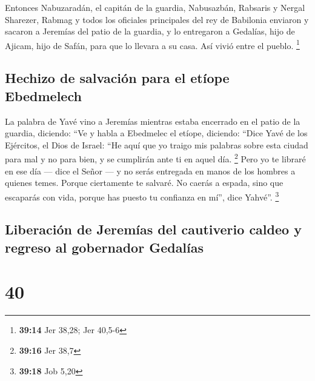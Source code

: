  Entonces Nabuzaradán, el capitán de la guardia,
Nabusazbán, Rabsaris y Nergal Sharezer, Rabmag y todos los oficiales
principales del rey de Babilonia  enviaron y sacaron a
Jeremías del patio de la guardia, y lo entregaron a Gedalías, hijo de
Ajicam, hijo de Safán, para que lo llevara a su casa. Así vivió entre el
pueblo. \footnote{\textbf{39:14} Jer 38,28; Jer 40,5-6}

\hypertarget{hechizo-de-salvaciuxf3n-para-el-etuxedope-ebedmelech}{%
\subsection{Hechizo de salvación para el etíope
Ebedmelech}\label{hechizo-de-salvaciuxf3n-para-el-etuxedope-ebedmelech}}

 La palabra de Yavé vino a Jeremías mientras estaba
encerrado en el patio de la guardia, diciendo:  ``Ve y
habla a Ebedmelec el etíope, diciendo: ``Dice Yavé de los Ejércitos, el
Dios de Israel: ``He aquí que yo traigo mis palabras sobre esta ciudad
para mal y no para bien, y se cumplirán ante ti en aquel día.
\footnote{\textbf{39:16} Jer 38,7}  Pero yo te libraré en
ese día --- dice el Señor --- y no serás entregada en manos de los
hombres a quienes temes.  Porque ciertamente te salvaré.
No caerás a espada, sino que escaparás con vida, porque has puesto tu
confianza en mí'', dice Yahvé''. \footnote{\textbf{39:18} Job 5,20}

\hypertarget{liberaciuxf3n-de-jeremuxedas-del-cautiverio-caldeo-y-regreso-al-gobernador-gedaluxedas}{%
\subsection{Liberación de Jeremías del cautiverio caldeo y regreso al
gobernador
Gedalías}\label{liberaciuxf3n-de-jeremuxedas-del-cautiverio-caldeo-y-regreso-al-gobernador-gedaluxedas}}

\hypertarget{section-39}{%
\section{40}\label{section-39}}

